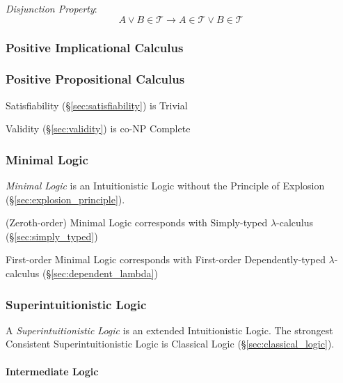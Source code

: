 \emph{Disjunction Property}:
\[
  A \vee B \in \mathcal{T}
  \rightarrow A \in \mathcal{T} \vee B \in \mathcal{T}
\]



\subsubsection{Positive Implicational Calculus}
\label{sec:positive_implicational}



\subsubsection{Positive Propositional Calculus}
\label{sec:positive_propositional}

Satisfiability (\S\ref{sec:satisfiability}) is Trivial

Validity (\S\ref{sec:validity}) is co-NP Complete %



\subsubsection{Minimal Logic}\label{sec:minimal_logic}

\emph{Minimal Logic} is an Intuitionistic Logic without the Principle
of Explosion (\S\ref{sec:explosion_principle}).

(Zeroth-order) Minimal Logic corresponds with Simply-typed
$\lambda$-calculus (\S\ref{sec:simply_typed})

First-order Minimal Logic corresponds with First-order Dependently-typed
$\lambda$-calculus (\S\ref{sec:dependent_lambda})



\subsubsection{Superintuitionistic Logic}
\label{sec:superintuitionistic_logic}

A \emph{Superintuitionistic Logic} is an extended Intuitionistic
Logic. The strongest Consistent Superintuitionistic Logic is Classical
Logic (\S\ref{sec:classical_logic}).



\paragraph{Intermediate Logic}\label{sec:intermediate_logic}\hfill

